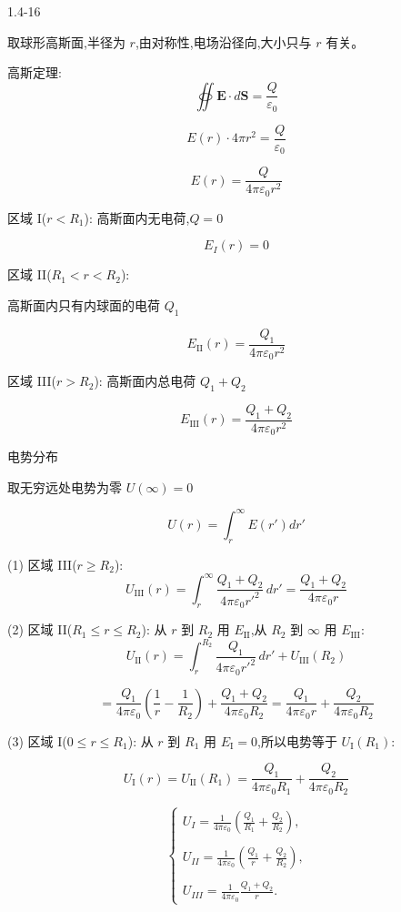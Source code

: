 \documentclass{article}
\begin{document}
\newpage

1.4-16

取球形高斯面,半径为 $ r $,由对称性,电场沿径向,大小只与 $ r $ 有关。

高斯定理:
$$\oiint \mathbf{E} \cdot d\mathbf{S} = \frac{Q}{\varepsilon_0}$$

$$E(r) \cdot 4\pi r^2 = \frac{Q}{\varepsilon_0}$$

$$E(r) = \frac{Q}{4\pi\varepsilon_0 r^2}$$

区域 I($ r < R_1 $):  
高斯面内无电荷,$ Q = 0 $

$$E_I(r) = 0$$

区域 II($ R_1 < r < R_2 $):  

高斯面内只有内球面的电荷 $ Q_1 $ 

$$E_{\text{II}}(r) = \frac{Q_1}{4\pi\varepsilon_0 r^2}$$

区域 III($ r > R_2 $):  
高斯面内总电荷 $ Q_1 + Q_2 $  

$$E_{\text{III}}(r) = \frac{Q_1 + Q_2}{4\pi\varepsilon_0 r^2}$$

电势分布

取无穷远处电势为零 $ U(\infty) = 0 $

$$U(r) = \int_{r}^{\infty} E(r')  dr'$$

(1) 区域 III($ r \ge R_2 $):  
$$U_{\text{III}}(r) = \int_{r}^{\infty} \frac{Q_1 + Q_2}{4\pi\varepsilon_0 r'^2} \, dr'= \frac{Q_1 + Q_2}{4\pi\varepsilon_0 r}$$

(2) 区域 II($ R_1 \le r \le R_2 $):  
从 $ r $ 到 $ R_2 $ 用 $ E_{\text{II}} $,从 $ R_2 $ 到 $ \infty $ 用 $ E_{\text{III}} $:
$$U_{\text{II}}(r) = \int_{r}^{R_2} \frac{Q_1}{4\pi\varepsilon_0 r'^2} \, dr' + U_{\text{III}}(R_2)$$

$$= \frac{Q_1}{4\pi\varepsilon_0} \left( \frac{1}{r} - \frac{1}{R_2} \right) + \frac{Q_1 + Q_2}{4\pi\varepsilon_0 R_2}= \frac{Q_1}{4\pi\varepsilon_0 r} + \frac{Q_2}{4\pi\varepsilon_0 R_2}$$

(3) 区域 I($ 0 \le r \le R_1 $):  
从 $ r $ 到 $ R_1 $ 用 $ E_{\text{I}} = 0 $,所以电势等于 $ U_{\text{I}}(R_1) $:

$$U_{\text{I}}(r) = U_{\text{II}}(R_1) = \frac{Q_1}{4\pi\varepsilon_0 R_1} + \frac{Q_2}{4\pi\varepsilon_0 R_2}$$

$$\quad\begin{cases}U_I=\frac{1}{4\pi\varepsilon_0}\left(\frac{Q_1}{R_1}+\frac{Q_2}{R_2}\right),\\\\U_{II}=\frac{1}{4\pi\varepsilon_0}\left(\frac{Q_1}{r}+\frac{Q_2}{R_2}\right),\\\\U_{III}=\frac{1}{4\pi\varepsilon_0}\frac{Q_1+Q_2}{r}.&\end{cases}$$
\end{document}
